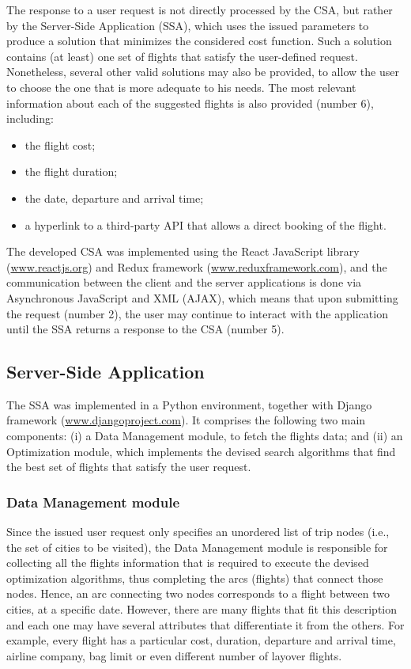 \documentclass[onecolumn]{elsarticle}
\begin{document}
The response to a user request is not directly processed by the CSA, but rather by the Server-Side Application (SSA), which uses the issued parameters to produce a solution that minimizes the considered cost function. Such a solution  contains (at least) one set of flights that satisfy the user-defined request. Nonetheless, several other valid solutions may also be provided, to allow the user to choose the one that is more adequate to his needs. The most relevant information about each of the suggested flights is also provided (number 6), including:
\begin{itemize}
  \item the flight cost;
  \item the flight duration;
  \item the date, departure and arrival time;
  \item a hyperlink to a third-party API that allows a direct booking of the flight.
\end{itemize}

The developed CSA was implemented using the React JavaScript library (\url{www.reactjs.org}) and Redux framework (\url{www.reduxframework.com}), and the communication between the client and the server applications is done via Asynchronous JavaScript and XML (AJAX), which means that upon submitting the request (number 2), the user may continue to interact with the application until the SSA returns a response to the CSA (number 5).


\subsection{Server-Side Application}
\label{sec:ssa}

The SSA was implemented in a Python environment, together with Django framework (\url{www.djangoproject.com}). It comprises the following two main components: (i) a Data Management module, to fetch the flights data; and (ii) an Optimization module, which implements the devised search algorithms that find the best set of flights that satisfy the user request.


\subsubsection*{Data Management module}
\label{sec:ssa_data_management_system}

Since the issued user request only specifies an unordered list of trip nodes (i.e., the set of cities to be visited), the Data Management module is responsible for collecting all the flights information that is required to execute the devised optimization algorithms, thus completing the arcs (flights) that connect those nodes. Hence, an arc connecting two nodes corresponds to a flight between two cities, at a specific date. However, there are many flights that fit this description and each one may have several attributes that differentiate it from the others. For example, every flight has a particular cost, duration, departure and arrival time, airline company, bag limit or even different number of layover flights.
\end{document}
